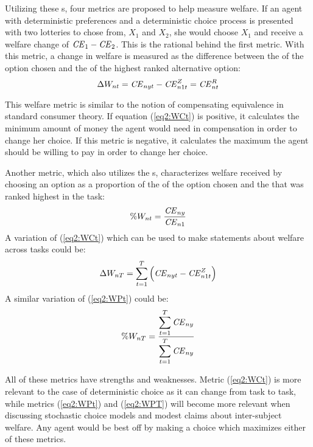 \documentclass[../main.tex]{subfiles}
\begin{document}
Utilizing these {\CE}s, four metrics are proposed to help measure welfare.
If an agent with deterministic preferences and a deterministic choice process is presented with two lotteries to chose from, $X_1$ and $X_2$, she would choose $X_1$ and receive a welfare change of ${\mathit{CE}}_1 - {\mathit{CE}}_2$.
This is the rational behind the first metric.
With this metric, a change in welfare is measured as the difference between the {\CE} of the option chosen and the {\CE} of the highest ranked alternative option:
\begin{equation}
	\label{eq2:WCt}
	\Delta W_{nt} = {\mathit{CE}}_{nyt} - {\mathit{CE}}_{n1t}^Z = {\mathit{CE}}_{nt}^R
\end{equation}

This welfare metric is similar to the notion of compensating equivalence in standard consumer theory.
If equation (\ref{eq2:WCt}) is positive, it calculates the minimum amount of money the agent would need in compensation in order to change her choice.
If this metric is negative, it calculates the maximum the agent should be willing to pay in order to change her choice.

Another metric, which also utilizes the {\CE}s, characterizes welfare received by choosing an option as a proportion of the {\CE} of the option chosen and the {\CE} that was ranked highest in the task:
\begin{equation}
	\label{eq2:WPt}
	\%W_{nt} = \frac{ {\mathit{CE}}_{ny} }{ {\mathit{CE}}_{n1} }
\end{equation}
\noindent A variation of (\ref{eq2:WCt}) which can be used to make statements about welfare across tasks could be:
\begin{equation}
	\label{eq2:WCT}
	\Delta W_{nT} = \sum_{t=1}^T \left( {\mathit{CE}}_{nyt} - {\mathit{CE}}_{n1t}^Z \right)
\end{equation}
\noindent A similar variation of (\ref{eq2:WPt}) could be:
\begin{equation}
	\label{eq2:WPT}
	\%W_{nT} = \frac{\displaystyle\sum_{t=1}^{T} {\mathit{CE}}_{ny} }{\displaystyle\sum_{t=1}^{T} {\mathit{CE}}_{ny}}
\end{equation}

All of these metrics have strengths and weaknesses.
Metric (\ref{eq2:WCt}) is more relevant to the case of deterministic choice as it can change from task to task, while metrics (\ref{eq2:WPt}) and (\ref{eq2:WPT}) will become more relevant when discussing stochastic choice models and modest claims about inter-subject welfare.
Any agent would be best off by making a choice which maximizes either of these metrics.
\end{document}

